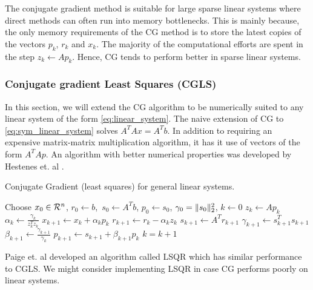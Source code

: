 The conjugate gradient method is suitable for large sparse linear systems where
direct methods can often run into memory bottlenecks. This is mainly because,
the only memory requirements of the CG method is to store the latest copies
of the vectors $p_k$, $r_k$ and $x_k$. The majority of the computational efforts
are spent in the step $z_k \leftarrow A p_k$. Hence, CG tends to perform better
in sparse linear systems.

\subsubsection*{Conjugate gradient Least Squares (CGLS)}
In this section, we will extend the CG algorithm to be numerically suited to any linear system of the form 
\eqref{eq:linear_system}. The naive extension of CG to \eqref{eq:sym_linear_system}
solves $A^TAx = A^Tb$. In addition to requiring an expensive matrix-matrix
multiplication algorithm, it has it use of vectors of the form $A^TAp$. An 
algorithm with better numerical properties was developed by Hestenes et. al \cite{hestenes1952methods}.


\begin{algorithm}[CGLS]\label{alg:cgls}
\caption{Conjugate Gradient (least squares) for general linear systems.}
\begin{algorithmic}
\State Choose $x_0 \in \mathcal{R}^n$, $r_0 \leftarrow b$,\ $s_0 \leftarrow A^Tb$, $p_0 \leftarrow s_0$, $\gamma_0=\| s_0 \|_2^2$, $k \leftarrow 0$ 
  \State$z_k \leftarrow Ap_k$ 
  \State$\alpha_k \leftarrow \frac{\gamma_{k}}{z_k^Tz_k}$ 
  \State$x_{k+1} \leftarrow x_k + \alpha_k p_k$ 
  \State$r_{k+1} \leftarrow r_k - \alpha_k z_k$ 
  \State$s_{k+1} \leftarrow A^T r_{k+1} $ 
  \State$\gamma_{k+1} \leftarrow s_{k+1}^T s_{k+1}$ 
  \State$\beta_{k+1} \leftarrow \frac{\gamma_{k+1}}{\gamma_k}$ 
  \State$p_{k+1} \leftarrow s_{k+1} + \beta_{k+1} p_k$ 
  \State$k = k + 1$ 
\EndWhile
\end{algorithmic}
\end{algorithm}

Paige et. al \cite{paige1982lsqr} developed an algorithm called LSQR which has similar performance
to CGLS. We might consider implementing LSQR in case CG performs poorly on 
linear systems.


